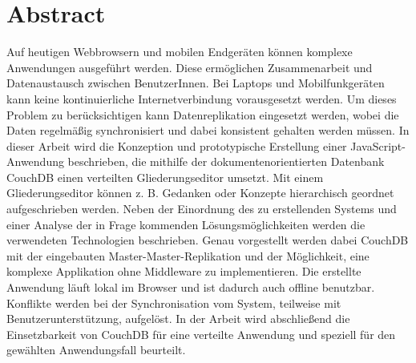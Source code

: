 \chapter*{Abstract}

Auf heutigen Webbrowsern und mobilen Endgeräten können komplexe Anwendungen ausgeführt werden. Diese ermöglichen Zusammenarbeit und Datenaustausch zwischen BenutzerInnen. Bei Laptops und Mobilfunkgeräten kann keine kontinuierliche Internetverbindung vorausgesetzt werden. Um dieses Problem zu berücksichtigen kann Datenreplikation eingesetzt werden, wobei die Daten regelmäßig synchronisiert und dabei konsistent gehalten werden müssen. In dieser Arbeit wird die Konzeption und prototypische Erstellung einer JavaScript-Anwendung beschrieben, die mithilfe der dokumentenorientierten Datenbank CouchDB einen verteilten Gliederungseditor umsetzt. Mit einem Gliederungseditor können z. B. Gedanken oder Konzepte hierarchisch geordnet aufgeschrieben werden. Neben der Einordnung des zu erstellenden Systems und einer Analyse der in Frage kommenden Lösungsmöglichkeiten werden die verwendeten Technologien beschrieben. Genau vorgestellt werden dabei CouchDB mit der eingebauten Master-Master-Replikation und der Möglichkeit, eine komplexe Applikation ohne Middleware zu implementieren. Die erstellte Anwendung läuft lokal im Browser und ist dadurch auch offline benutzbar. Konflikte werden bei der Synchronisation vom System, teilweise mit Benutzerunterstützung, aufgelöst. In der Arbeit wird abschließend die Einsetzbarkeit von CouchDB für eine verteilte Anwendung und speziell für den gewählten Anwendungsfall beurteilt.